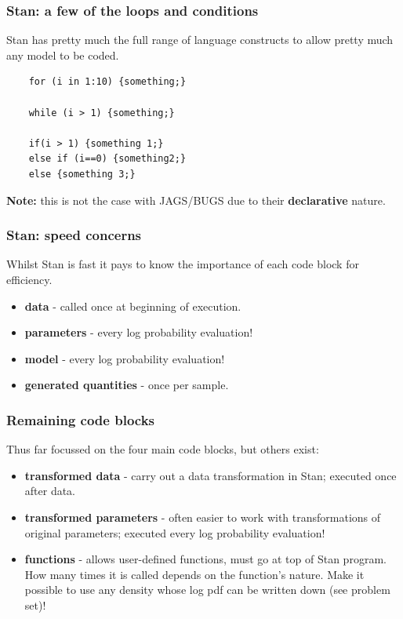 \documentclass[handout]{beamer}
\begin{document}
\begin{frame}[fragile]
\frametitle{Stan: a few of the loops and conditions}
 Stan has pretty much the full range of language constructs to allow pretty much any model to be coded.
\begin{verbatim}
    for (i in 1:10) {something;}
    
    while (i > 1) {something;}

    if(i > 1) {something 1;}
    else if (i==0) {something2;}
    else {something 3;}
\end{verbatim}

 \textbf{Note:} this is not the case with JAGS/BUGS due to their \textbf{declarative} nature.
	
\end{frame}

\begin{frame}
	\frametitle{Stan: speed concerns}
	 Whilst Stan is fast it pays to know the importance of each code block for efficiency.
	
	\begin{itemize}
		\item<3-> \textbf{data} - called once at beginning of execution.
		\item<4-> \textbf{parameters} - every log probability evaluation!
		\item<5-> \textbf{model} - every log probability evaluation!
		\item<6-> \textbf{generated quantities} - once per sample.
	\end{itemize}	
	
\end{frame}

\begin{frame}
	\frametitle{Remaining code blocks}
	 Thus far focussed on the four main code blocks, but others exist:
	
	\begin{itemize}
		\item<3-> \textbf{transformed data} - carry out a data transformation in Stan; executed once after data.
		\item<4-> \textbf{transformed parameters} - often easier to work with transformations of original parameters; executed every log probability evaluation!
		\item<5-> \textbf{functions} - allows user-defined functions, must go at top of Stan program. How many times it is called depends on the function's nature. Make it possible to use any density whose log pdf can be written down (see problem set)!
	\end{itemize}
\end{frame}
\end{document}
